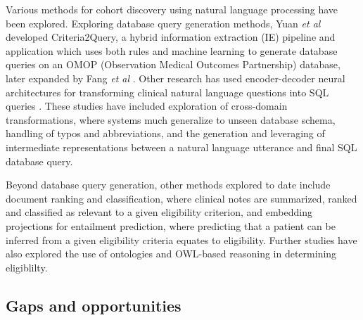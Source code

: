 \documentclass[../main.tex]{subfiles}
\begin{document}
Various methods for cohort discovery using natural language processing have been explored. Exploring database query generation methods, Yuan \textit{et al} developed Criteria2Query, a hybrid information extraction (IE) pipeline and application which uses both rules and machine learning to generate database queries on an OMOP \cite{hripcsak2015observational} (Observation Medical Outcomes Partnership) database, later expanded by Fang \textit{et al} \cite{fang2022combining}. Other research has used encoder-decoder neural architectures for transforming clinical natural language questions into SQL queries \cite{bae2021question, park2021knowledge, wang2020text, pan2021bert, dhayne2021emr2vec}. These studies have included exploration of cross-domain transformations, where systems much generalize to unseen database schema\cite{park2021knowledge}, handling of typos and abbreviations\cite{bae2021question}, and the generation and leveraging of intermediate representations between a natural language utterance and final SQL database query.\cite{pan2021bert} 

Beyond database query generation, other methods explored to date include document ranking and classification\cite{chen2019clinical,soni2020patient}, where clinical notes are summarized, ranked and classified as relevant to a given eligibility criterion, and embedding projections for entailment prediction\cite{dhayne2021emr2vec, zhang2020deepenroll}, where predicting that a patient can be inferred from a given eligibility criteria equates to eligibility. Further studies have also explored the use of ontologies and OWL-based reasoning in determining eligiblilty\cite{patel2007matching, huang2013semanticct, baader2018patient, johnson2016mimic, patrao2015recruit}.
    
\subsection*{Gaps and opportunities}
\end{document}
